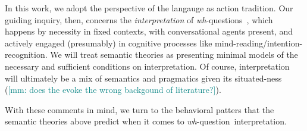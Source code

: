 \documentclass[12pt,letterpaper,table,svgnames,dvipsnames]{article}
\newcommand{\mm}[1]{\textcolor{teal}{[mm: #1]}}
\newcommand{\whq}{\emph{wh}-question~}
\newcommand{\whqs}{\emph{wh}-questions~}
\begin{document}
In this work, we adopt the perspective of the langauge as action tradition. Our guiding inquiry, then, concerns the \emph{interpretation} of \whqs, which happens by necessity in fixed contexts, with conversational agents present, and actively engaged (presumably) in cognitive processes like mind-reading/intention-recognition. We will treat semantic theories as presenting minimal models of the necessary and sufficient conditions on interpretation. Of course, interpretation will ultimately be a mix of semantics and pragmatics given its situated-ness (\mm{does the evoke the wrong backgound of literature?}).

With these comments in mind, we turn to the behavioral patters that the semantic theories above predict when it comes to \whq interpretation.



\end{document}
